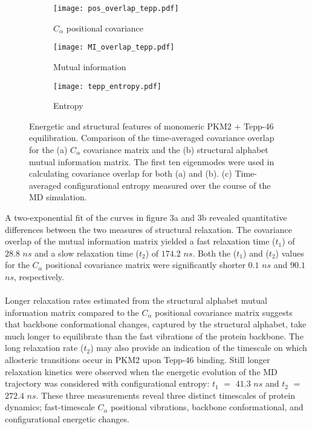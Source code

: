 \documentclass[11pt]{article}
\begin{document}
\begin{figure}[!ht]
\centering
\begin{subfigure}[b]{.4\linewidth}
    \centering
    \texttt{[image: pos\_overlap\_tepp.pdf]}
    \caption{$C_\alpha$ positional covariance}\label{fig:3a}
  \end{subfigure}%
  \begin{subfigure}[b]{.4\linewidth}
    \centering
    \texttt{[image: MI\_overlap\_tepp.pdf]}
    \caption{Mutual information}\label{fig:3b}
  \end{subfigure}%
  \begin{subfigure}[b]{.4\linewidth}
    \centering
    \texttt{[image: tepp\_entropy.pdf]}
    \caption{Entropy}\label{fig:3b}
  \end{subfigure}%
\caption{Energetic and structural features of monomeric PKM2 + Tepp-46 equilibration. Comparison of the time-averaged covariance overlap for the (a) $C_\alpha$ covariance matrix and the (b) structural alphabet mutual information matrix. The first ten eigenmodes were used in calculating covariance overlap for both (a) and (b). (c) Time-averaged configurational entropy measured over the course of the MD simulation.}\label{fig:2}
\end{figure}
A two-exponential fit of the curves in figure 3a and 3b revealed quantitative differences between the two measures of structural relaxation. The covariance overlap of the mutual information matrix yielded a fast relaxation time ($t_1$) of $28.8$ $ns$ and a slow relaxation time ($t_2$) of $174.2$ $ns$. Both the ($t_1$) and ($t_2$) values for the $C_\alpha$ positional covariance matrix were significantly shorter $0.1$ $ns$ and $90.1$ $ns$, respectively.
\\
\\
Longer relaxation rates estimated from the structural alphabet mutual information matrix compared to the $C_\alpha$ positional covariance matrix suggests that backbone conformational changes, captured by the structural alphabet, take much longer to equilibrate than the fast vibrations of the protein backbone. The long relaxation rate ($t_2$) may also provide an indication of the timescale on which allosteric transitions occur in PKM2 upon Tepp-46 binding. Still longer relaxation kinetics were observed when the energetic evolution of the MD trajectory was considered with configurational entropy: $t_1$ $=$ $41.3$ $ns$ and $t_2$ $=$ $272.4$ $ns$. These three measurements reveal three distinct timescales of protein dynamics; fast-timescale $C_\alpha$ positional vibrations, backbone conformational, and configurational energetic changes.
\end{document}
